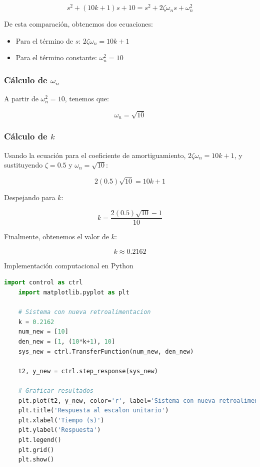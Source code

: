 \documentclass[10pt]{article}
\theoremstyle{definition}
\theoremstyle{remark}
\theoremstyle{definition}
\numberwithin{equation}{prob}
\begin{document}
\[
	s^2 + (10k + 1)s + 10 = s^2 + 2\zeta \omega_n s + \omega_n^2
\]

De esta comparación, obtenemos dos ecuaciones:

\begin{itemize}
	\item Para el término de \( s \): \( 2\zeta \omega_n = 10k + 1 \)
	\item Para el término constante: \( \omega_n^2 = 10 \)
\end{itemize}

\subsubsection{Cálculo de \texorpdfstring{\( \omega_n \)}{omega\_n}}

A partir de \( \omega_n^2 = 10 \), tenemos que:

\[
	\omega_n = \sqrt{10}
\]

\subsubsection{Cálculo de \texorpdfstring{\( k \)}{k}}

Usando la ecuación para el coeficiente de amortiguamiento, \( 2\zeta \omega_n = 10k + 1 \), y sustituyendo \( \zeta = 0.5 \) y \( \omega_n = \sqrt{10} \):

\[
	2(0.5)\sqrt{10} = 10k + 1
\]

Despejando para \( k \):

\[
	k = \frac{2(0.5)\sqrt{10} - 1}{10}
\]

Finalmente, obtenemos el valor de \( k \):

\[
	k \approx 0.2162
\]

Implementación computacional en Python
\begin{lstlisting}[language=Python]
	import control as ctrl
	import matplotlib.pyplot as plt

	# Sistema con nueva retroalimentacion
	k = 0.2162
	num_new = [10]
	den_new = [1, (10*k+1), 10]
	sys_new = ctrl.TransferFunction(num_new, den_new)

	t2, y_new = ctrl.step_response(sys_new)

	# Graficar resultados
	plt.plot(t2, y_new, color='r', label='Sistema con nueva retroalimentacion')
	plt.title('Respuesta al escalon unitario')
	plt.xlabel('Tiempo (s)')
	plt.ylabel('Respuesta')
	plt.legend()
	plt.grid()
	plt.show()
\end{lstlisting}
\end{document}
